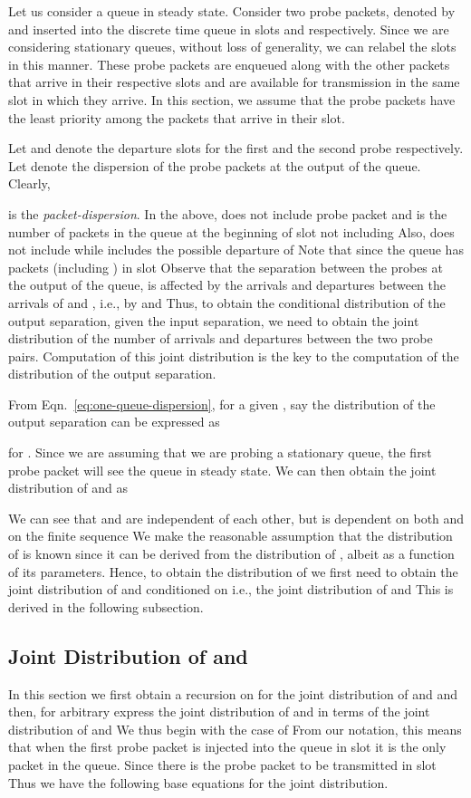 \documentclass[11pt]{article}
\begin{document}
Let us consider a queue in steady state. Consider two probe packets,
denoted by  and  inserted into the discrete time queue in
slots  and  respectively. Since we are considering stationary
queues, without loss of generality, we can relabel the slots in this
manner. These probe packets are enqueued along with the other packets
that arrive in their respective slots and are available for
transmission in the same slot in which they arrive. In this section,
we assume that the probe packets have the least priority among the
packets that arrive in their slot.

Let  and  denote the departure slots for the first and the
second probe respectively. Let  denote the
dispersion of the probe packets at the output of the queue.  Clearly,

 is the \emph{packet-dispersion}. In the above,  does
not include probe packet  and  is the number of packets
in the queue at the beginning of slot  not including  Also,
 does not include  while  includes the
possible departure of  Note that  since
the queue has  packets (including ) in slot  Observe
that  the separation between the probes at the output of the
queue, is affected by the arrivals and departures between the arrivals
of  and , i.e., by  and  Thus, to
obtain the conditional distribution of the output separation, given
the input separation, we need to obtain the joint distribution of the
number of arrivals and departures between the two probe pairs.
Computation of this joint distribution is the key to the computation
of the distribution of the output separation.

From Eqn.~\ref{eq:one-queue-dispersion}, for a given , say
 the distribution of the output separation  can be
expressed as

for .  Since we are assuming that we are probing a 
stationary queue, the first probe packet  will see the queue in
steady state. We can then obtain the joint distribution of 
and  as



We can see that  and  are independent of each other, but
 is dependent on both  and on the finite sequence
 We make the reasonable assumption that the
distribution of  is known since it can be derived from the
distribution of , albeit as a function of its parameters. Hence,
to obtain the distribution of  we first need to obtain the joint
distribution of  and  conditioned on 
i.e., the joint distribution of  and  This is
derived in the following subsection.

\subsection{Joint Distribution of  and }
\label{sec:A_1,m-and-X_m-joint} 
In this section we first obtain a recursion on  for the joint
distribution of  and  and then, for arbitrary
 express the joint distribution of  and  in
terms of the joint distribution of  and  We
thus begin with the case of  From our notation, this means
that when the first probe packet is injected into the queue in slot
 it is the only packet in the queue.  Since there is the probe
packet to be transmitted in slot   Thus we have the
following base equations for the joint distribution.
\end{document}
